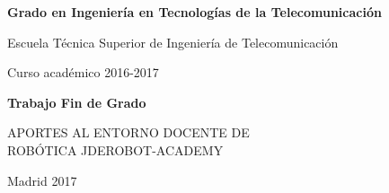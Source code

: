 \begin{titlepage}

\thispagestyle{empty}

\vspace{2cm}

\begin{figure}[htb]
	\centerline{}
\end{figure}

\vspace{5mm}
\begin{center}
	{\Large {\bf Grado en Ingeniería en Tecnologías de la Telecomunicación}}
	\vspace{5mm}
	
	{\large Escuela Técnica Superior de Ingeniería de Telecomunicación}
	\vspace{5mm}
	
	{\large Curso académico 2016-2017}
	
	\vspace{1.0cm}
	
	{\large {\bf Trabajo Fin de Grado}} 
	
	\vspace{2cm}
	{\Huge {APORTES AL ENTORNO DOCENTE DE
			\\ \vspace{0.2cm} 
			ROBÓTICA JDEROBOT-ACADEMY}}
	
\end{center}

\vspace{4cm}

\vspace{0.5cm}
\begin{center}
	\large{Madrid 2017}
\end{center}

\end{titlepage}
